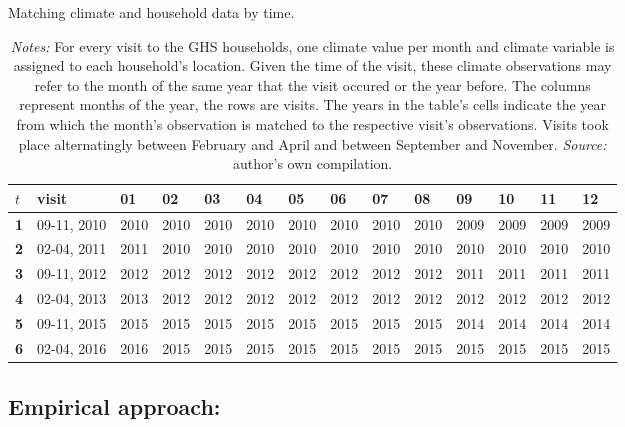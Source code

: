 \documentclass[a4paper,12pt]{article}
\theoremstyle{plain}
\theoremstyle{definition}
\theoremstyle{definition}
\theoremstyle{definition}
\theoremstyle{definition}
\begin{document}
\begin{table}[t!]
    \singlespacing
    \centering
    \caption{Matching climate and household data by time.}
    \caption*{\footnotesize{\textit{Notes:} For every visit to the GHS households, one climate value per month and climate variable is assigned to each household's location. Given the time of the visit, these climate observations may refer to the month of the same year that the visit occured or the year before. The columns represent months of the year, the rows are visits. The years in the table's cells indicate the year from which the month's observation is matched to the respective visit's observations. Visits took place alternatingly between February and April and between September and November. \textit{Source:} author's own compilation.}}
    \begin{tabular}{|p{0.3cm}|p{2.1cm}|p{0.7cm}|p{0.7cm}|p{0.7cm}|p{0.7cm}|p{0.7cm}|p{0.7cm}|p{0.7cm}|p{0.7cm}|p{0.7cm}|p{0.7cm}|p{0.7cm}|p{0.7cm}| }
    \hline
    \raggedright\textbf{$t$} & \textbf{visit} & \textbf{01} & \textbf{02}& \textbf{03}& \textbf{04}& \textbf{05}& \textbf{06}& \textbf{07}& \textbf{08}& \textbf{09}& \textbf{10}& \textbf{11}& \textbf{12} \\
    \hline    
    \textbf{1} & 09-11, 2010 & 2010 & 2010 & 2010 & 2010 & 2010 & 2010 & 2010 & 2010 & 2009 & 2009 & 2009 & 2009\\
    \textbf{2} & 02-04, 2011 & 2011 & 2010 & 2010 & 2010 & 2010 & 2010 & 2010 & 2010 & 2010 & 2010 & 2010 & 2010\\
    \textbf{3} & 09-11, 2012 & 2012 & 2012 & 2012 & 2012 & 2012 & 2012 & 2012 & 2012 & 2011 & 2011 & 2011 & 2011\\
    \textbf{4} & 02-04, 2013 & 2013 & 2012 & 2012 & 2012 & 2012 & 2012 & 2012 & 2012 & 2012 & 2012 & 2012 & 2012\\
    \textbf{5} & 09-11, 2015 & 2015 & 2015 & 2015 & 2015 & 2015 & 2015 & 2015 & 2015 & 2014 & 2014 & 2014 & 2014\\
    \textbf{6} & 02-04, 2016 & 2016 & 2015 & 2015 & 2015 & 2015 & 2015 & 2015 & 2015 & 2015 & 2015 & 2015 & 2015\\
    \hline
    \end{tabular}
    \label{tab:cruvars}
\end{table}

\subsection{Empirical approach:}
\label{sub:empirical_approach}
\end{document}
